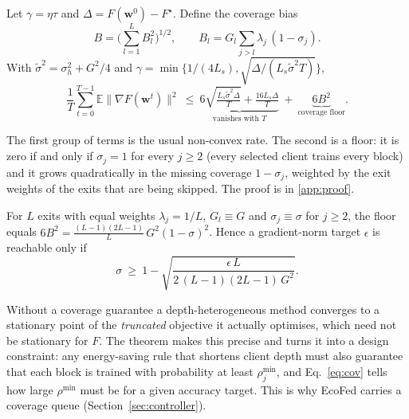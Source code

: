 \begin{theorem}\label{thm:main}
Let $\gamma=\eta\tau$ and $\Delta=F(\mathbf w^0)-F^\star$. Define the coverage bias
\begin{equation}\label{eq:B}
B=\Big(\sum_{l=1}^{L}B_l^2\Big)^{1/2},\qquad B_l=G_l\sum_{j>l}\lambda_j\,(1-\sigma_j).
\end{equation}
With $\tilde\sigma^2=\sigma_h^2+G^2/4$ and $\gamma=\min\{1/(4L_s),\sqrt{\Delta/(L_s\tilde\sigma^2T)}\}$,
\begin{equation}\label{eq:thm}
\frac1T\sum_{t=0}^{T-1}\mathbb E\|\nabla F(\mathbf w^t)\|^2\ \le\ \underbrace{6\sqrt{\tfrac{L_s\tilde\sigma^2\Delta}{T}}+\tfrac{16L_s\Delta}{T}}_{\text{vanishes with }T}\ +\ \underbrace{6B^2}_{\text{coverage floor}} .
\end{equation}
\end{theorem}

The first group of terms is the usual non-convex rate. The second is a floor: it is zero if and only if $\sigma_j=1$ for every $j\ge2$ (every selected client trains every block) and it grows quadratically in the missing coverage $1-\sigma_j$, weighted by the exit weights of the exits that are being skipped. The proof is in \ref{app:proof}.

\begin{corollary}\label{cor:cov}
For $L$ exits with equal weights $\lambda_j=1/L$, $G_l\equiv G$ and $\sigma_j\equiv\sigma$ for $j\ge2$, the floor equals $6B^2=\frac{(L-1)(2L-1)}{L}\,G^2(1-\sigma)^2$. Hence a gradient-norm target $\epsilon$ is reachable only if
\begin{equation}\label{eq:cov}
\sigma\ \ge\ 1-\sqrt{\frac{\epsilon\,L}{2\,(L-1)(2L-1)\,G^2}} .
\end{equation}
\end{corollary}

\begin{remark}[Interpretation]
Without a coverage guarantee a depth-heterogeneous method converges to a stationary point of the \emph{truncated} objective it actually optimises, which need not be stationary for $F$. The theorem makes this precise and turns it into a design constraint: any energy-saving rule that shortens client depth must also guarantee that each block is trained with probability at least $\rho_j^{\min}$, and Eq.~\eqref{eq:cov} tells how large $\rho^{\min}$ must be for a given accuracy target. This is why EcoFed carries a coverage queue (Section~\ref{sec:controller}).
\end{remark}


